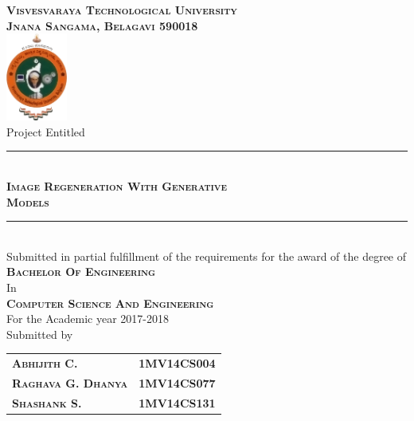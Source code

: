 

\begin{titlepage} %
	\newcommand{\HRule}{\rule{\linewidth}{0.5mm}} %

	\center %

	\textsc{\Large \textbf{Visvesvaraya Technological University\\[3pt]Jnana Sangama, Belagavi 590018}}\\[10pt] 
	\includegraphics[width=0.15\textwidth]{images/vtu.png}\\[10pt] 

	{\large Project Entitled}\\[5pt] %


	\HRule\\[10pt]
	\textsc{ \textbf{\LARGE Image Regeneration With Generative \\[5pt] Models}}\\[10pt]

	\HRule\\[10pt]
	Submitted in partial fulfillment of the requirements for the award of the degree of\\
	\large{
		\textsc{
		\textbf{Bachelor Of Engineering}}\\
		In \\
		\textsc{
		\textbf{Computer Science And Engineering}} \\
		For the Academic year 2017-2018 
	}\\[10pt]
	\large{Submitted by}\\[2pt]
	\begin{tabular}{ l r }
		\textsc{\large \textbf{Abhijith C.}}       & \large \textbf{1MV14CS004} \\
		\textsc{\large \textbf{Raghava G. Dhanya}} & \large \textbf{1MV14CS077} \\
		\textsc{\large \textbf{Shashank S.}}       & \large \textbf{1MV14CS131}
	\end{tabular}\\[15pt]


\end{titlepage}
